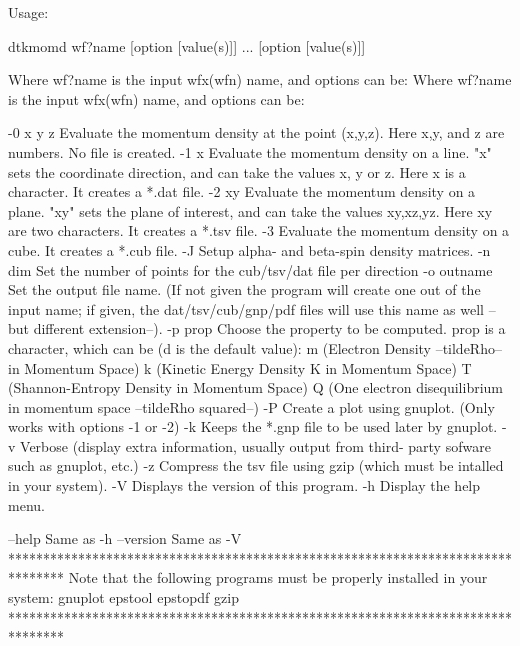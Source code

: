 Usage:

	dtkmomd wf?name [option [value(s)]] ... [option [value(s)]]

Where wf?name is the input wfx(wfn) name, and options can be:
Where wf?name is the input wfx(wfn) name, and options can be:

  -0 x y z  	Evaluate the momentum density at the point (x,y,z).
            	  Here x,y, and z are numbers. No file is created.
  -1  x     	Evaluate the momentum density on a line. "x" sets the coordinate
            	  direction, and can take the values x, y or z.
            	  Here x is a character. It creates a *.dat file.
  -2  xy    	Evaluate the momentum density on a plane. "xy" sets the plane of
            	  interest, and can take the values xy,xz,yz.
            	  Here xy are two characters. It creates a *.tsv file.
  -3        	Evaluate the momentum density on a cube.
            	  It creates a *.cub file.
  -J        	Setup alpha- and beta-spin density matrices.
  -n  dim   	Set the number of points for the cub/tsv/dat file per direction
  -o outname	Set the output file name.
            	  (If not given the program will create one out of
            	  the input name; if given, the dat/tsv/cub/gnp/pdf files will
            	  use this name as well --but different extension--).
  -p prop   	Choose the property to be computed. prop is a character,
            	  which can be (d is the default value):
         		m (Electron Density --tildeRho-- in Momentum Space)
         		k (Kinetic Energy Density K in Momentum Space)
         		T (Shannon-Entropy Density in Momentum Space)
         		Q (One electron disequilibrium in momentum space --tildeRho squared--)
  -P     	Create a plot using gnuplot. (Only works with options -1 or -2)
  -k     	Keeps the *.gnp file to be used later by gnuplot.
  -v     	Verbose (display extra information, usually output from third-
         	  party sofware such as gnuplot, etc.)
  -z     	Compress the tsv file using gzip (which must be intalled
         	   in your system).
  -V        	Displays the version of this program.
  -h     	Display the help menu.

  --help    		Same as -h
  --version 		Same as -V
********************************************************************************
  Note that the following programs must be properly installed in your system:
                                    gnuplot
                                    epstool
                                    epstopdf
                                      gzip
********************************************************************************
